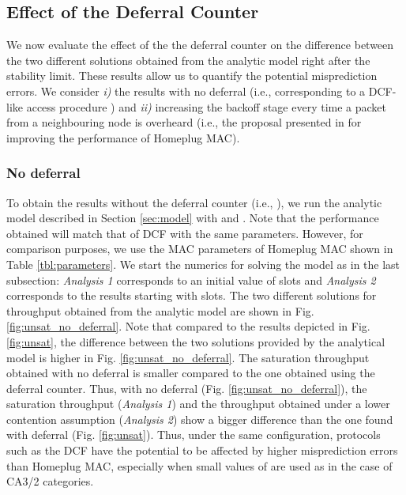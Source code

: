 \documentclass[preprint,12pt]{elsarticle}
\begin{document}
\subsection{Effect of the Deferral Counter}

We now evaluate the effect of the the deferral counter on the difference between the two different solutions obtained from the analytic model right after the stability limit. These results allow us to quantify the potential misprediction errors. We consider \emph{i)} the results with no deferral (i.e., corresponding to a DCF-like access procedure \cite{IEEE80211-IEEESTD1999}) and \emph{ii)} increasing the backoff stage every time a packet from a neighbouring node is overheard (i.e., the proposal presented in \cite{campista2005improving} for improving the performance of Homeplug MAC). 

\subsubsection{No deferral}

To obtain the results without the deferral counter (i.e., ), we run the analytic model described in Section \ref{sec:model} with  and . Note that the performance obtained will match that of DCF with the same parameters. However, for comparison purposes, we use the MAC parameters of Homeplug MAC shown in Table \ref{tbl:parameters}. We start the numerics for solving the model as in the last subsection: \emph{Analysis 1} corresponds to an initial value of  slots and \emph{Analysis 2} corresponds to the results starting with  slots. The two different solutions for throughput obtained from the analytic model are shown in Fig. \ref{fig:unsat_no_deferral}. Note that compared to the results depicted in Fig. \ref{fig:unsat}, the difference between the two solutions provided by the analytical model is higher in Fig. \ref{fig:unsat_no_deferral}. The saturation throughput obtained with no deferral is smaller compared to the one obtained using the deferral counter. Thus, with no deferral (Fig. \ref{fig:unsat_no_deferral}), the saturation throughput (\emph{Analysis 1}) and the throughput obtained under a lower contention assumption (\emph{Analysis 2}) show a bigger difference than the one found with deferral (Fig. \ref{fig:unsat}). Thus, under the same configuration, protocols such as the DCF have the potential to be affected by higher misprediction errors than Homeplug MAC, especially when small values of  are used as 
in the case of CA3/2 categories. 
\end{document}
